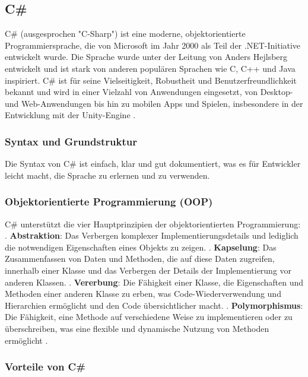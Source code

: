 \subsection{C\#}
C\# (ausgesprochen "C-Sharp") ist eine moderne, objektorientierte Programmiersprache, die von Microsoft im Jahr 2000 als Teil der .NET-Initiative entwickelt wurde. Die Sprache wurde unter der Leitung von Anders Hejlsberg entwickelt und ist stark von anderen populären Sprachen wie C, C++ und Java inspiriert. C\# ist für seine Vielseitigkeit, Robustheit und Benutzerfreundlichkeit bekannt und wird in einer Vielzahl von Anwendungen eingesetzt, von Desktop- und Web-Anwendungen bis hin zu mobilen Apps und Spielen, insbesondere in der Entwicklung mit der Unity-Engine \cite{hejlsberg2000csharp}.

\subsubsection{Syntax und Grundstruktur}
Die Syntax von C\# ist einfach, klar und gut dokumentiert, was es für Entwickler leicht macht, die Sprache zu erlernen und zu verwenden.

\subsubsection{Objektorientierte Programmierung (OOP)}

C\# unterstützt die vier Hauptprinzipien der objektorientierten Programmierung:
\\

. \textbf{Abstraktion}: Das Verbergen komplexer Implementierungsdetails und lediglich die notwendigen Eigenschaften eines Objekts zu zeigen.
. \textbf{Kapselung}: Das Zusammenfassen von Daten und Methoden, die auf diese Daten zugreifen, innerhalb einer Klasse und das Verbergen der Details der Implementierung vor anderen Klassen.
. \textbf{Vererbung}: Die Fähigkeit einer Klasse, die Eigenschaften und Methoden einer anderen Klasse zu erben, was Code-Wiederverwendung und Hierarchien ermöglicht und den Code übersichtlicher macht.
. \textbf{Polymorphismus}: Die Fähigkeit, eine Methode auf verschiedene Weise zu implementieren oder zu überschreiben, was eine flexible und dynamische Nutzung von Methoden ermöglicht \cite{booch1991oop}.

\subsubsection{Vorteile von C\#}


